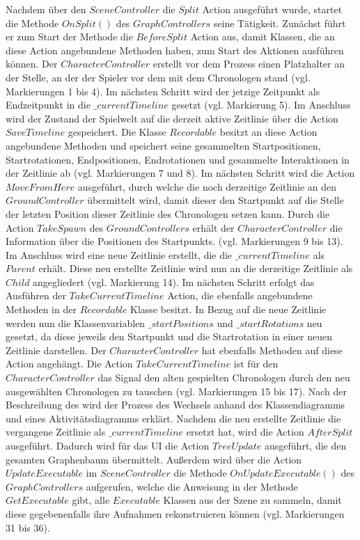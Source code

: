 Nachdem über den $SceneController$ die $Split$ Action ausgeführt wurde, startet die Methode $OnSplit()$ des $GraphControllers$ seine Tätigkeit. Zunächst führt er zum Start der Methode die $BeforeSplit$ Action aus, damit  Klassen, die an diese Action angebundene Methoden haben, zum Start des  Aktionen ausführen können. Der $CharacterController$ erstellt vor dem  Prozess einen Platzhalter an der Stelle, an der der Spieler vor dem  mit dem Chronologen stand (vgl. Markierungen 1 bis 4). Im nächsten Schritt wird der jetzige Zeitpunkt als Endzeitpunkt in die $\_currentTimeline$ gesetzt (vgl. Markierung 5). Im Anschluss wird der Zustand der Spielwelt auf die derzeit aktive Zeitlinie über die Action $SaveTimeline$ gespeichert. Die Klasse $Recordable$ besitzt an diese Action angebundene Methoden und speichert seine gesammelten Startpositionen, Startrotationen, Endpositionen, Endrotationen und gesammelte Interaktionen in der Zeitlinie ab (vgl. Markierungen 7 und 8). Im nächsten Schritt wird die Action $MoveFromHere$ ausgeführt, durch welche die noch derzeitige Zeitlinie an den $GroundController$ übermittelt wird, damit dieser den Startpunkt auf die Stelle der letzten Position dieser Zeitlinie des Chronologen setzen kann. Durch die Action $TakeSpawn$ des $GroundControllers$ erhält der $CharacterController$ die Information über die Positionen des Startpunkts. (vgl. Markierungen 9 bis 13). Im Anschluss wird eine neue Zeitlinie erstellt, die die $\_currentTimeline$ als $Parent$ erhält. Diese neu erstellte Zeitlinie wird nun an die derzeitige Zeitlinie als $Child$ angegliedert (vgl. Markierung 14).
Im nächsten Schritt erfolgt das Ausführen der $TakeCurrentTimeline$ Action, die ebenfalls angebundene Methoden in der $Recordable$ Klasse besitzt. In Bezug auf die neue Zeitlinie werden nun die Klassenvariablen $\_startPositions$ und $\_startRotations$ neu gesetzt, da diese jeweils den Startpunkt und die Startrotation in einer neuen Zeitlinie darstellen. Der $CharacterController$ hat ebenfalls Methoden auf diese Action angehängt. Die Action $TakeCurrentTimeline$ ist für den $CharacterController$ das Signal den alten gespielten Chronologen durch den neu ausgewählten Chronologen zu tauschen (vgl. Markierungen 15 bis 17). Nach der Beschreibung des  wird der Prozess des Wechsels anhand des Klassendiagramms und eines Aktivitätsdiagramms erklärt. Nachdem die neu erstellte Zeitlinie die vergangene Zeitlinie als $\_currentTimeline$ ersetzt hat, wird die Action $AfterSplit$ ausgeführt. Dadurch wird für das \ac{UI} die Action $TreeUpdate$ ausgeführt, die den gesamten Graphenbaum übermittelt. Außerdem wird über die Action $UpdateExecutable$ im $SceneController$ die Methode $OnUpdateExecutable()$ des $GraphControllers$ aufgerufen, welche die Anweisung in der Methode $GetExecutable$ gibt, alle $Executable$ Klassen aus der Szene zu sammeln, damit diese gegebenenfalls ihre Aufnahmen rekonstruieren können (vgl. Markierungen 31 bis 36).


